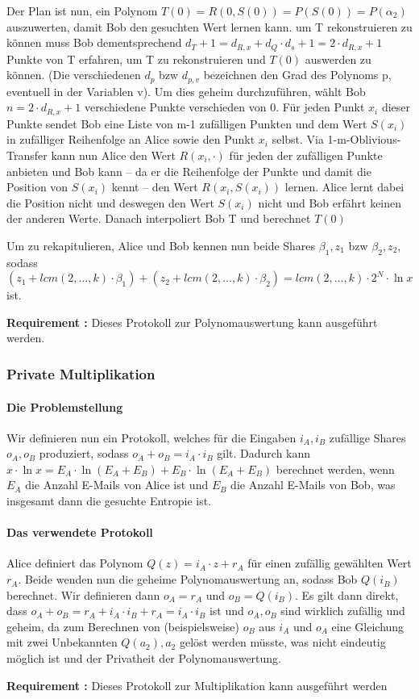 \documentclass{article}
\newcounter{requirementscount}{}
\newcommand{\requirement}[1] {
        \addtocounter{requirementscount}{1}
        {\bf Requirement \therequirementscount:} #1\\
    }
\begin{document}
Der Plan ist nun, ein Polynom \(T(0) = R(0,S(0)) = P(S(0)) = P(\alpha_2)\)
auszuwerten, damit Bob den gesuchten Wert lernen kann. um T rekonstruieren
zu k\"onnen muss Bob dementsprechend 
\(d_T + 1 = d_{R,x} + d_Q \cdot d_s +1= 2\cdot d_{R,x}+1\) 
Punkte von T erfahren,
um T zu rekonstruieren und \(T(0)\) auswerden zu k\"onnen. (Die verschiedenen
\(d_p\) bzw \(d_{p,v}\) bezeichnen den Grad des Polynoms p, eventuell in der
Variablen v). Um dies geheim durchzuf\"uhren, w\"ahlt Bob \(n = 2 \cdot d_{R,x}+1\)
verschiedene Punkte verschieden von 0. F\"ur jeden Punkt \(x_i\) dieser Punkte
sendet Bob eine Liste von m-1 zuf\"alligen Punkten und dem Wert \(S(x_i)\) 
in zuf\"alliger Reihenfolge an Alice sowie den Punkt \(x_i\) selbst.
Via 1-m-Oblivious-Transfer kann nun Alice den Wert \(R(x_i, \cdot)\) f\"ur jeden
der zuf\"alligen Punkte anbieten und Bob kann -- da er die Reihenfolge der
Punkte und damit die Position von \(S(x_i)\) kennt -- den Wert \(R(x_i, S(x_i))\)
lernen. Alice lernt dabei die Position nicht und deswegen den Wert \(S(x_i)\)
nicht und Bob erf\"ahrt keinen der anderen Werte. Danach interpoliert Bob T und berechnet 
\(T(0)\)

Um zu rekapitulieren, Alice und Bob kennen nun beide Shares \(\beta_1, z_1\) bzw 
\(\beta_2, z_2\), sodass 
\((z_1 + lcm(2,\dots,k)\cdot\beta_1) + (z_2 + lcm(2,\dots,k)\cdot\beta_2)
 = lcm(2,\dots,k)\cdot2^N\cdot\ln x\) ist.\\
\requirement{Dieses Protokoll zur Polynomauswertung kann ausgef\"uhrt werden.}

\subsubsection{Private Multiplikation}
\paragraph{Die Problemstellung}
Wir definieren nun ein Protokoll, welches f\"ur die Eingaben \(i_A, i_B\) 
zuf\"allige Shares \(o_A, o_B\) produziert, sodass \(o_A + o_B = i_A \cdot i_B\)
gilt. Dadurch kann
\(x \cdot \ln x = E_A \cdot \ln (E_A + E_B) + E_B \cdot \ln (E_A + E_B)\) berechnet
werden, wenn \(E_A\) die Anzahl E-Mails von Alice ist und \(E_B\) die Anzahl E-Mails
von Bob, was insgesamt dann die gesuchte Entropie ist.

\paragraph{Das verwendete Protokoll}
Alice definiert das Polynom \(Q(z) = i_A \cdot z + r_A\) f\"ur einen
zuf\"allig gew\"ahlten Wert \(r_A\). Beide wenden nun die geheime 
Polynomauswertung an, sodass Bob \(Q(i_B)\) berechnet. Wir definieren
dann \(o_A = r_A\) und \(o_B = Q(i_B)\). Es gilt dann direkt, dass
\(o_A + o_B = r_A + i_A \cdot i_B + r_A = i_A \cdot i_B\) ist und
\(o_A, o_B\) sind wirklich zuf\"allig und geheim, da zum Berechnen von 
(beispielsweise) \(o_B\) aus \(i_A\) und \(o_A\) eine Gleichung
mit zwei Unbekannten \(Q(a_2), a_2\) gel\"ost werden m\"usste, was
nicht eindeutig m\"oglich ist und der Privatheit der Polynomauswertung.\\
\requirement{Dieses Protokoll zur Multiplikation kann ausgef\"uhrt werden}
\end{document}
